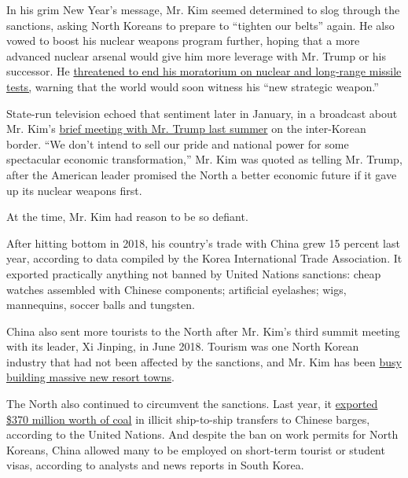 In his ​grim New Year's message​, Mr. Kim seemed determined to slog
through the sanctions, asking North Koreans to prepare to ``tighten our
belts'' again. He also vowed to boost his nuclear weapons program
further, hoping that a more advanced nuclear arsenal would give him more
leverage with Mr. Trump or his successor. He
\href{https://www.nytimes3xbfgragh.onion/2019/12/31/world/asia/north-korea-kim-speech.html}{threatened
to end his moratorium on nuclear and long-range missile tests,} warning
that ​the world would soon witness ​his ``new strategic weapon​.''

State-run television echoed that sentiment later in January, in a
broadcast about Mr. Kim's
\href{https://www.nytimes3xbfgragh.onion/2019/06/30/world/asia/trump-north-korea-dmz.html}{brief
meeting with Mr. Trump last summer} on the inter-Korean border. ``We
don't intend to sell our pride and national power for some spectacular
economic transformation,'' Mr. Kim was quoted as telling Mr. Trump,
after the American leader promised the North a better economic future if
it gave up its nuclear weapons first.

At the time, Mr. Kim had reason to be so defiant.

After hitting bottom in 2018, his country's trade with China grew 15
percent last year, according to data compiled by the Korea International
Trade Association. It exported practically anything not banned by United
Nations sanctions: cheap watches assembled with Chinese components;
artificial eyelashes; wigs, mannequins, soccer balls and tungsten.

China also sent more tourists to the North after Mr. Kim's third summit
meeting with its leader, Xi Jinping, in June 2018. Tourism was one North
Korean industry that had not been affected by the sanctions, and Mr. Kim
has been
\href{https://www.38north.org/tag/wonsan-kalma-tourist-zone/}{busy
building massive new resort towns}.

The North also continued to circumvent the sanctions. Last year, it
\href{https://www.reuters.com/article/us-northkorea-sanctions-un-exclusive/exclusive-north-korea-enhanced-nuclear-missile-programs-in-2019-in-breach-of-sanctions-u-n-report-idUSKBN20426J}{exported
\$370 million worth of coal} in illicit ship-to-ship transfers to
Chinese barges, according to the United Nations. And despite the ban on
work permits for North Koreans, China allowed many to be employed on
short-term tourist or student visas, according to analysts and news
reports​ in South Korea​.

